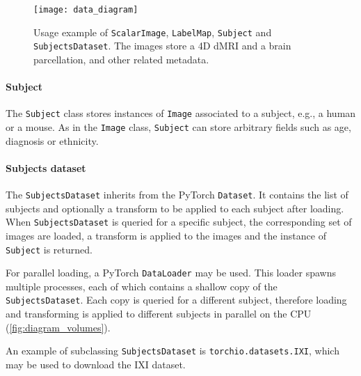 \begin{figure}
  \centering
  \texttt{[image: data\_diagram]}
  \caption[Usage example of different data structures in TorchIO]{
    Usage example of \texttt{ScalarImage}, \texttt{LabelMap},
    \texttt{Subject} and \texttt{SubjectsDataset}.
    The images store a 4D \ac{dMRI} and a brain parcellation,
    and other related metadata.
  }
  \label{fig:data_structures}
\end{figure}


\paragraph{Subject}

The \texttt{Subject} class stores instances of \texttt{Image} associated to a subject, e.g., a human or a mouse.
As in the \texttt{Image} class, \texttt{Subject} can store arbitrary fields such as age, diagnosis or ethnicity.


\paragraph{Subjects dataset}

The \texttt{SubjectsDataset} inherits from the PyTorch \texttt{Dataset}.
It contains the list of subjects and optionally a transform to be applied to each subject after loading.
When \texttt{SubjectsDataset} is queried for a specific subject, the corresponding set of images are loaded, a transform is applied to the images and the instance of \texttt{Subject} is returned.

For parallel loading, a PyTorch \texttt{DataLoader} may be used.
This loader spawns multiple processes, each of which contains a shallow copy of the \texttt{SubjectsDataset}.
Each copy is queried for a different subject, therefore loading and transforming is applied to different subjects in parallel on the \ac{CPU} (\cref{fig:diagram_volumes}).

An example of subclassing \texttt{SubjectsDataset} is \texttt{torchio.datasets.IXI}, which may be used to download the \ac{IXI} dataset.


